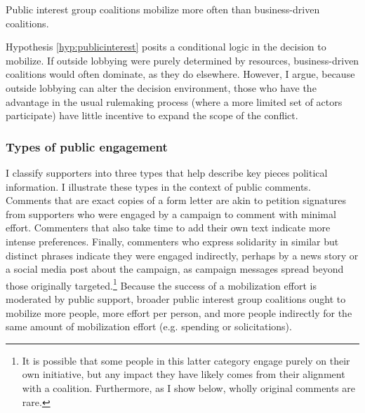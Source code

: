 \begin{subhyp}
\begin{hyp} \label{hyp:publicinterest}
Public interest group coalitions mobilize more often than business-driven coalitions.
\end{hyp}

Hypothesis \ref{hyp:publicinterest} posits a conditional logic in the decision to mobilize. If outside lobbying were purely determined by resources, business-driven coalitions would often dominate, as they do elsewhere. However, I argue, because outside lobbying can alter the decision environment, those who have the advantage in the usual rulemaking process (where a more limited set of actors participate) have little incentive to expand the scope of the conflict.








\subsubsection{Types of public engagement} I classify supporters into three types that help describe key pieces political information. I illustrate these types in the context of public comments. Comments that are exact copies of a form letter are akin to petition signatures from supporters who were engaged by a campaign to comment with minimal effort. Commenters that also take time to add their own text indicate more intense preferences. Finally, commenters who express solidarity in similar but distinct phrases indicate they were engaged indirectly, perhaps by a news story or a social media post about the campaign, as campaign messages spread beyond those originally targeted.\footnote{It is possible that some people in this latter category engage purely on their own initiative, but any impact they have likely comes from their alignment with a coalition. Furthermore, as I show below, wholly original comments are rare.} Because the success of a mobilization effort is moderated by public support, broader public interest group coalitions ought to mobilize more people, more effort per person, and more people indirectly for the same amount of mobilization effort (e.g. spending or solicitations).  


\end{subhyp}
